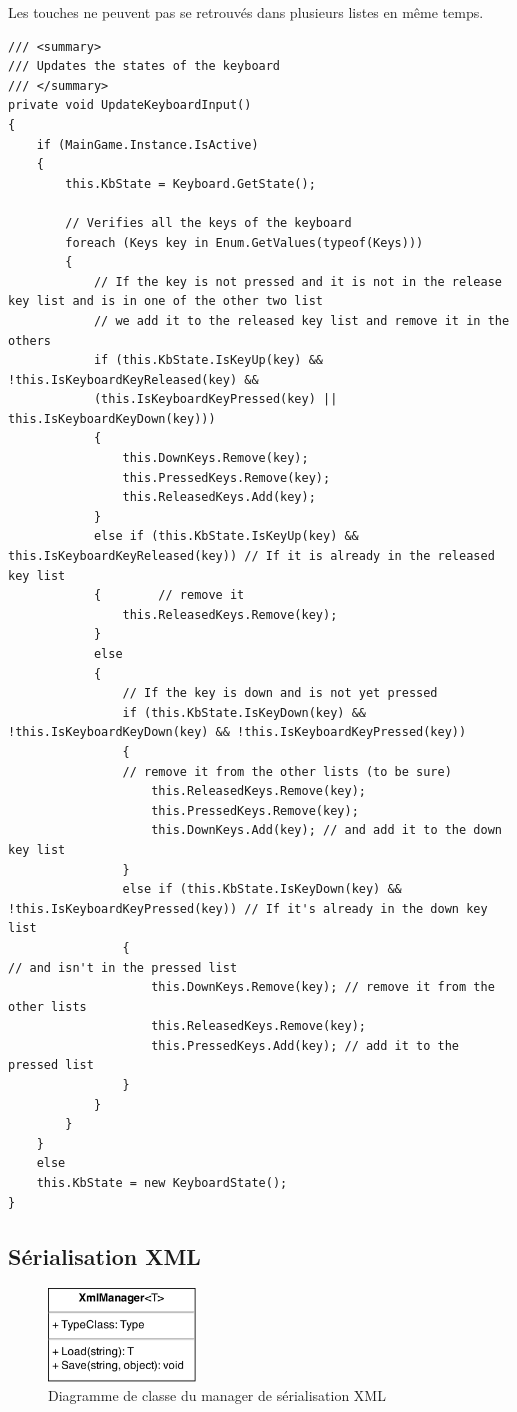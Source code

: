 \documentclass[11pt, a4paper, oneside]{report}
\begin{document}
Les touches ne peuvent pas se retrouvés dans plusieurs listes en même temps.

\begin{lstlisting}[caption=Mise-à-jour des entrées, label=lst:inputUpdate]
/// <summary>
/// Updates the states of the keyboard
/// </summary>
private void UpdateKeyboardInput()
{
	if (MainGame.Instance.IsActive)
	{
		this.KbState = Keyboard.GetState();
		
		// Verifies all the keys of the keyboard
		foreach (Keys key in Enum.GetValues(typeof(Keys)))
		{
			// If the key is not pressed and it is not in the release key list and is in one of the other two list
			// we add it to the released key list and remove it in the others
			if (this.KbState.IsKeyUp(key) && !this.IsKeyboardKeyReleased(key) &&
			(this.IsKeyboardKeyPressed(key) || this.IsKeyboardKeyDown(key)))
			{
				this.DownKeys.Remove(key);
				this.PressedKeys.Remove(key);
				this.ReleasedKeys.Add(key);
			}
			else if (this.KbState.IsKeyUp(key) && this.IsKeyboardKeyReleased(key)) // If it is already in the released key list
			{        // remove it
				this.ReleasedKeys.Remove(key);
			}
			else
			{
				// If the key is down and is not yet pressed
				if (this.KbState.IsKeyDown(key) && !this.IsKeyboardKeyDown(key) && !this.IsKeyboardKeyPressed(key))
				{
				// remove it from the other lists (to be sure)
					this.ReleasedKeys.Remove(key);
					this.PressedKeys.Remove(key);
					this.DownKeys.Add(key); // and add it to the down key list
				}
				else if (this.KbState.IsKeyDown(key) && !this.IsKeyboardKeyPressed(key)) // If it's already in the down key list
				{                                                                   // and isn't in the pressed list
					this.DownKeys.Remove(key); // remove it from the other lists
					this.ReleasedKeys.Remove(key);
					this.PressedKeys.Add(key); // add it to the pressed list
				}
			}
		}
	}
	else
	this.KbState = new KeyboardState();
}
\end{lstlisting}
\subsection{Sérialisation XML}
\begin{figure}[H]
	\begin{center}
	\includegraphics[width=0.35\textwidth]{XmlManager}
	\caption{Diagramme de classe du manager de sérialisation XML}
	\label{fig:XmlManager}
	\end{center}
\end{figure}
\end{document}
